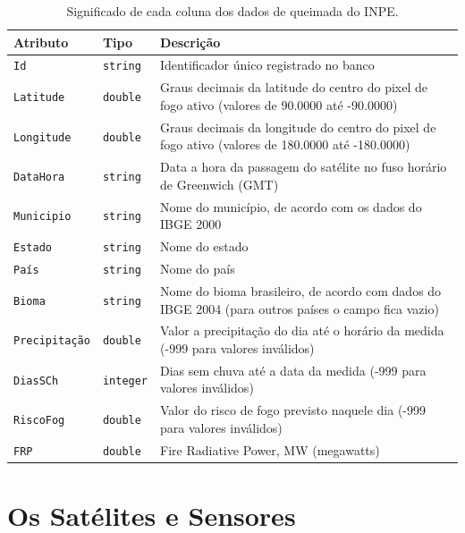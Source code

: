 \documentclass[cic,tc]{iiufrgs}
\begin{document}
\begin{table}[htbp]
\centering
\caption{Significado de cada coluna dos dados de queimada do INPE.}
\begin{tabular}{@{}llp{9cm}@{}}
 \toprule
 \textbf{Atributo} & \textbf{Tipo} & \textbf{Descrição} \\
 \midrule
 \texttt{Id} & \texttt{string} & Identificador único registrado no banco \\
 \texttt{Latitude} & \texttt{double} & Graus decimais da latitude do centro 
                     do pixel de fogo ativo (valores de 90.0000 até -90.0000) \\ 
 \texttt{Longitude} & \texttt{double} & Graus decimais da longitude do centro 
                     do pixel de fogo ativo (valores de 180.0000 até -180.0000) \\  
 \texttt{DataHora} & \texttt{string} & Data a hora da passagem do satélite no fuso 
                     horário de Greenwich (GMT) \\   
 \texttt{Municipio} & \texttt{string} & Nome do município, de acordo com os dados 
                     do IBGE 2000 \\
 \texttt{Estado} & \texttt{string} & Nome do estado \\
 \texttt{País} & \texttt{string} & Nome do país \\  
 \texttt{Bioma} & \texttt{string} & Nome do bioma brasileiro, de acordo com 
                     dados do IBGE 2004 (para outros países o campo fica vazio) \\
 \texttt{Precipitação} & \texttt{double} & Valor a precipitação do dia até 
                     o horário da medida (-999 para valores inválidos) \\
 \texttt{DiasSCh} & \texttt{integer} & Dias sem chuva até a data da medida 
                     (-999 para valores inválidos) \\
 \texttt{RiscoFog} & \texttt{double} & Valor do risco de fogo previsto naquele dia 
                     (-999 para valores inválidos) \\
 \texttt{FRP} & \texttt{double} & Fire Radiative Power, MW (megawatts) \\
 \bottomrule
\end{tabular}
\label{table:inpeColumns}
\end{table}

\section{Os Satélites e Sensores}
\end{document}
